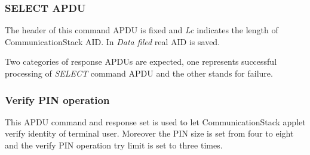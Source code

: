 \subsubsection{SELECT APDU}
The header of this command APDU is fixed and \emph{Lc} indicates the length of CommunicationStack AID. In \emph{Data filed} real AID is saved.
\begin{table}[!htbp]
\caption{SELECT command APDU}
\label{select-apdu}
\end{table}
Two categories of response APDUs are expected, one represents successful processing of \emph{SELECT} command APDU and the other stands for failure.
\begin{table}[!htbp]
\caption{SELECT response APDU}
\label{select-response-apdu}
\end{table}

\subsubsection{Verify PIN operation}
This APDU command and response set is used to let CommunicationStack applet verify identity of terminal user. Moreover the PIN size is set from four to eight and the verify PIN operation try limit is set to three times.

\begin{table}[!htbp]
\caption{Verify PIN command }
\label{verify-command-apdu}
\end{table}

